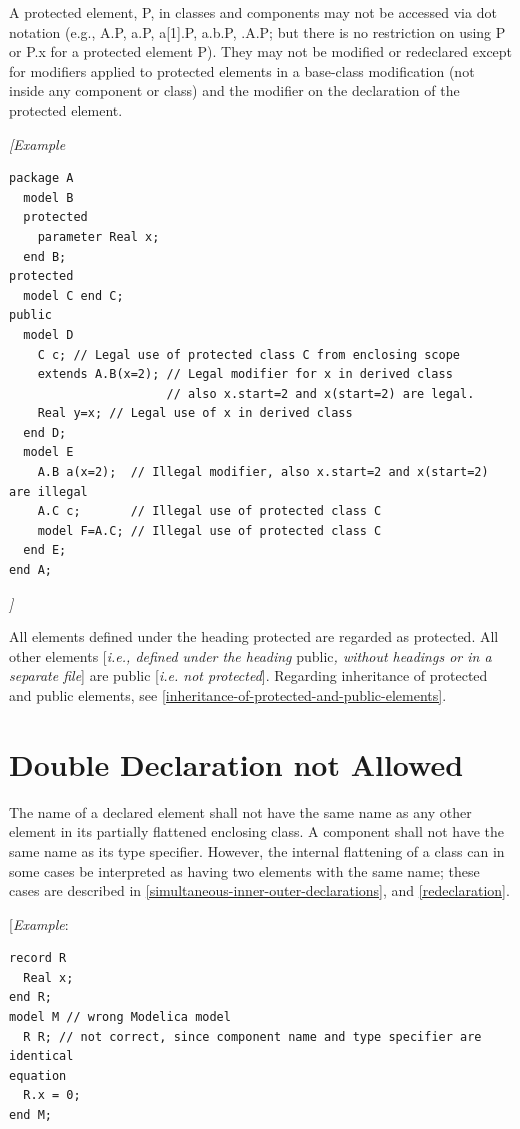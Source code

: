 \documentclass[10pt,a4paper]{report}
\def\doublelabel#1{\label{#1}\hypertarget{#1}{}}
\begin{document}
A protected element, P, in classes and components may not be accessed
via dot notation (e.g., A.P, a.P, a{[}1{]}.P, a.b.P, .A.P; but there is
no restriction on using P or P.x for a protected element P). They may
not be modified or redeclared except for modifiers applied to protected
elements in a base-class modification (not inside any component or
class) and the modifier on the declaration of the protected element.

\emph{{[}Example}
\begin{lstlisting}[language=modelica]
package A
  model B
  protected
    parameter Real x;
  end B;
protected
  model C end C;
public
  model D
    C c; // Legal use of protected class C from enclosing scope
    extends A.B(x=2); // Legal modifier for x in derived class
                      // also x.start=2 and x(start=2) are legal.
    Real y=x; // Legal use of x in derived class
  end D;
  model E
    A.B a(x=2);  // Illegal modifier, also x.start=2 and x(start=2) are illegal
    A.C c;       // Illegal use of protected class C
    model F=A.C; // Illegal use of protected class C
  end E;
end A;
\end{lstlisting}

\emph{{]}}

All elements defined under the heading protected are regarded as
protected. All other elements {[}\emph{i.e., defined under the heading}
public\emph{, without headings or in a separate file}{]} are public
{[}\emph{i.e. not protected}{]}. Regarding inheritance of protected and
public elements, see \ref{inheritance-of-protected-and-public-elements}.

\section{Double Declaration not Allowed}\doublelabel{double-declaration-not-allowed}

The name of a declared element shall not have the same name as any other
element in its partially flattened enclosing class. A component shall
not have the same name as its type specifier. However, the internal
flattening of a class can in some cases be interpreted as having two
elements with the same name; these cases are described in \ref{simultaneous-inner-outer-declarations},
and \ref{redeclaration}.

{[}\emph{Example}:
\begin{lstlisting}[language=modelica]
record R
  Real x;
end R;
model M // wrong Modelica model
  R R; // not correct, since component name and type specifier are identical
equation
  R.x = 0;
end M;
\end{lstlisting}
\end{document}
